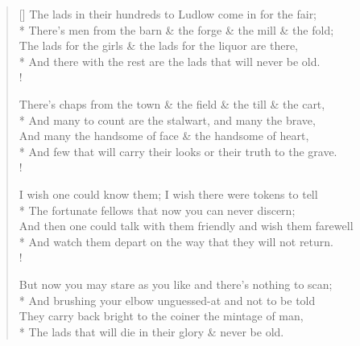 \documentclass[MAIN]{subfiles}
\begin{document}
\settowidth{\versewidth}{\vin There's men from the barn \& the forge \& the mill \& the fold;}
\begin{verse}[\versewidth]
The lads in their hundreds to {\sc Ludlow} come in for the fair;\\*
\vin There's men from the barn \& the forge \& the mill \& the fold;\\
The lads for the girls \& the lads for the liquor are there,\\*
\vin And there with the rest are the lads that will never be old.\\!

There's chaps from the town \& the field \& the till \& the cart,\\*
\vin And many to count are the stalwart, and many the brave,\\
And many the handsome of face \& the handsome of heart,\\*
\vin And few that will carry their looks or their truth to the grave.\\!

I wish one could know them; I wish there were tokens to tell\\*
\vin The fortunate fellows that now you can never discern;\\
And then one could talk with them friendly and wish them farewell\\*
\vin And watch them depart on the way that they will not return.\\!

But now you may stare as you like and there's nothing to scan;\\*
\vin And brushing your elbow unguessed-at and not to be told\\
They carry back bright to the coiner the mintage of man,\\*
\vin The lads that will die in their glory \& never be old.
\end{verse}
\end{document}

